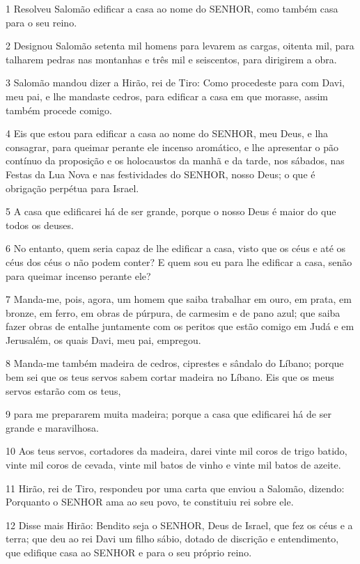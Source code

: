 \par 1 Resolveu Salomão edificar a casa ao nome do SENHOR, como também casa para o seu reino.
\par 2 Designou Salomão setenta mil homens para levarem as cargas, oitenta mil, para talharem pedras nas montanhas e três mil e seiscentos, para dirigirem a obra.
\par 3 Salomão mandou dizer a Hirão, rei de Tiro: Como procedeste para com Davi, meu pai, e lhe mandaste cedros, para edificar a casa em que morasse, assim também procede comigo.
\par 4 Eis que estou para edificar a casa ao nome do SENHOR, meu Deus, e lha consagrar, para queimar perante ele incenso aromático, e lhe apresentar o pão contínuo da proposição e os holocaustos da manhã e da tarde, nos sábados, nas Festas da Lua Nova e nas festividades do SENHOR, nosso Deus; o que é obrigação perpétua para Israel.
\par 5 A casa que edificarei há de ser grande, porque o nosso Deus é maior do que todos os deuses.
\par 6 No entanto, quem seria capaz de lhe edificar a casa, visto que os céus e até os céus dos céus o não podem conter? E quem sou eu para lhe edificar a casa, senão para queimar incenso perante ele?
\par 7 Manda-me, pois, agora, um homem que saiba trabalhar em ouro, em prata, em bronze, em ferro, em obras de púrpura, de carmesim e de pano azul; que saiba fazer obras de entalhe juntamente com os peritos que estão comigo em Judá e em Jerusalém, os quais Davi, meu pai, empregou.
\par 8 Manda-me também madeira de cedros, ciprestes e sândalo do Líbano; porque bem sei que os teus servos sabem cortar madeira no Líbano. Eis que os meus servos estarão com os teus,
\par 9 para me prepararem muita madeira; porque a casa que edificarei há de ser grande e maravilhosa.
\par 10 Aos teus servos, cortadores da madeira, darei vinte mil coros de trigo batido, vinte mil coros de cevada, vinte mil batos de vinho e vinte mil batos de azeite.
\par 11 Hirão, rei de Tiro, respondeu por uma carta que enviou a Salomão, dizendo: Porquanto o SENHOR ama ao seu povo, te constituiu rei sobre ele.
\par 12 Disse mais Hirão: Bendito seja o SENHOR, Deus de Israel, que fez os céus e a terra; que deu ao rei Davi um filho sábio, dotado de discrição e entendimento, que edifique casa ao SENHOR e para o seu próprio reino.
